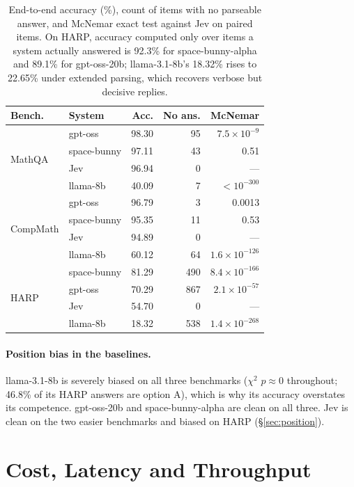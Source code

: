 \documentclass[11pt]{article}
\newcommand{\hic}[1]{\cellcolor{cellcyan}#1}
\begin{document}
\begin{table}[h]
\centering
\small
\setlength{\tabcolsep}{3pt}
\begin{tabular}{llrrr}
\toprule
\textbf{Bench.} & \textbf{System} & \textbf{Acc.} & \textbf{No ans.} & \textbf{McNemar} \\
\midrule
\multirow{4}{*}{MathQA}
 & gpt-oss & 98.30 & 95 & $7.5\!\times\!10^{-9}$ \\
 & space-bunny & 97.11 & 43 & 0.51 \\
 & Jev & 96.94 & \hic{0} & --- \\
 & llama-8b & 40.09 & 7 & $<\!10^{-300}$ \\
\midrule
\multirow{4}{*}{CompMath}
 & gpt-oss & 96.79 & 3 & 0.0013 \\
 & space-bunny & 95.35 & 11 & 0.53 \\
 & Jev & 94.89 & \hic{0} & --- \\
 & llama-8b & 60.12 & 64 & $1.6\!\times\!10^{-126}$ \\
\midrule
\multirow{4}{*}{HARP}
 & space-bunny & 81.29 & 490 & $8.4\!\times\!10^{-166}$ \\
 & gpt-oss & 70.29 & 867 & $2.1\!\times\!10^{-57}$ \\
 & Jev & 54.70 & \hic{0} & --- \\
 & llama-8b & 18.32 & 538 & $1.4\!\times\!10^{-268}$ \\
\bottomrule
\end{tabular}
\caption{End-to-end accuracy (\%), count of items with no parseable answer, and McNemar exact test against Jev on paired items. On HARP, accuracy computed only over items a system actually answered is 92.3\% for space-bunny-alpha and 89.1\% for gpt-oss-20b; llama-3.1-8b's 18.32\% rises to 22.65\% under extended parsing, which recovers verbose but decisive replies.}
\end{table}

\paragraph{Position bias in the baselines.} llama-3.1-8b is severely biased on all three benchmarks ($\chi^2$ $p \approx 0$ throughout; 46.8\% of its HARP answers are option A), which is why its accuracy overstates its competence. gpt-oss-20b and space-bunny-alpha are clean on all three. Jev is clean on the two easier benchmarks and biased on HARP (\S\ref{sec:position}).

\section{Cost, Latency and Throughput}
\label{app:cost}
\end{document}
